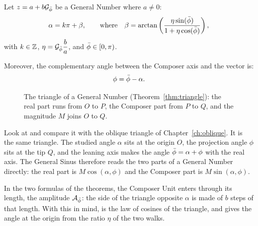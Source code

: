 \begin{theorem}\label{thm:phase}
Let $z = a + b\mathcal{G}_{\bar{\phi}}$ be a General Number where $a \neq 0$:
\[
\alpha = k\pi + \beta, \qquad \text{where} \quad \beta = \arctan\left(\frac{\eta\sin(\bar{\phi})}{1 + \eta\cos(\bar{\phi})}\right),
\]
with $k \in \mathbb{Z}$, $\eta = \mathcal{G}_{\bar{\phi}}\dfrac{b}{a}$, and $\bar{\phi} \in [0, \pi)$.

Moreover, the complementary angle between the Composer axis and the vector is:
\[
\phi = \bar{\phi} - \alpha .
\]
\end{theorem}

\begin{figure}[tb]
\myfloatalign
{}
\caption[The triangle of a General Number]{The triangle of a General Number (Theorem~\ref{thm:triangle}): the real part runs from $O$ to $P$, the Composer part from $P$ to $Q$, and the magnitude $M$ joins $O$ to $Q$.}
\label{fig:gn-triangle}
\end{figure}

\begin{plainwords}
Look at  and compare it with the oblique triangle of Chapter~\ref{ch:oblique}. It is the same triangle. The studied angle $\alpha$ sits at the origin $O$, the projection angle $\phi$ sits at the tip $Q$, and the leaning axis makes the angle $\bar{\phi} = \alpha + \phi$ with the real axis. The General Sinus therefore reads the two parts of a General Number directly: the real part is $M\cos(\alpha, \phi)$ and the Composer part is $M\sin(\alpha, \phi)$.

In the two formulas of the theorems, the Composer Unit enters through its length, the amplitude $\mathcal{A}_{\bar{\phi}}$: the side of the triangle opposite $\alpha$ is made of $b$ steps of that length. With this in mind,  is the law of cosines of the triangle, and  gives the angle at the origin from the ratio $\eta$ of the two walks.
\end{plainwords}

